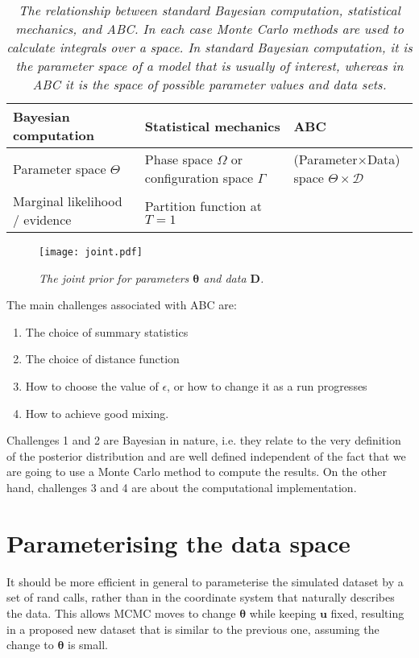 \documentclass[a4paper, 11pt]{article}
\newcommand{\params}{\boldsymbol{\theta}}	%
\newcommand{\data}{\boldsymbol{D}}  %
\newcommand{\rands}{\boldsymbol{u}}
\begin{document}
\begin{table}[ht!]
\centering
\small
\begin{tabular}{lll}
\hline
Bayesian computation		&		Statistical mechanics		&		ABC\\
\hline
Parameter space	$\Theta$	&		Phase space	$\Omega$ or configuration space $\Gamma$ 			& (Parameter$\times$Data) space $\Theta \times \mathcal{D}$\\		
Marginal likelihood / evidence	&	Partition function at $T=1$	&\\


\end{tabular}
\caption{\it The relationship between standard Bayesian computation, statistical
mechanics, and ABC. In each case Monte Carlo methods are used to calculate
integrals over a space. In standard Bayesian computation, it is the parameter
space of a model that is usually of interest, whereas in ABC it is the space
of possible parameter values {\it and} data sets.
\label{tab:relation}}
\end{table}


\begin{figure}[ht!]
\centering
\texttt{[image: joint.pdf]}
\caption{\it The joint prior for parameters $\params$ and data $\data$.
\label{fig:joint}}
\end{figure}

The main challenges associated with ABC are:
\begin{enumerate}
\item The choice of summary statistics
\item The choice of distance function
\item How to choose the value of $\epsilon$, or how to change it as a run
progresses
\item How to achieve good mixing.
\end{enumerate}
Challenges 1 and 2 are Bayesian in nature, i.e. they relate to the very
definition of the posterior distribution and are well defined independent of
the fact that we are going to use a Monte Carlo method to compute the
results. On the other hand, challenges 3 and 4 are about the computational implementation.

\section{Parameterising the data space}

It should be more efficient in general to parameterise the simulated dataset
by a set of rand calls, rather than in the coordinate system that naturally
describes the data. This allows MCMC moves to change $\params$ while keeping
$\rands$ fixed, resulting in a proposed new dataset that is similar to the
previous one, assuming the change to $\params$ is small.
\end{document}
